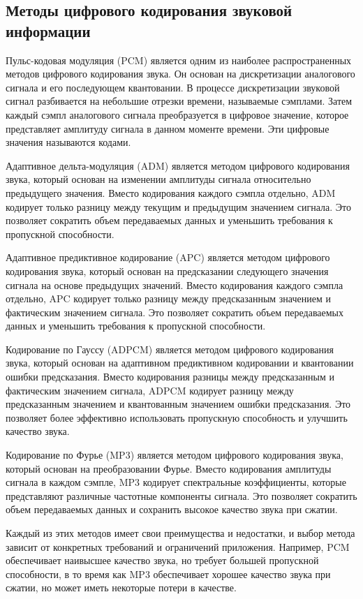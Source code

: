 \subsection{Методы цифрового кодирования звуковой информации}

Пульс-кодовая модуляция (PCM) является одним из наиболее распространенных методов цифрового кодирования звука. Он основан на дискретизации аналогового сигнала и его последующем квантовании. В процессе дискретизации звуковой сигнал разбивается на небольшие отрезки времени, называемые сэмплами. Затем каждый сэмпл аналогового сигнала преобразуется в цифровое значение, которое представляет амплитуду сигнала в данном моменте времени. Эти цифровые значения называются кодами.

Адаптивное дельта-модуляция (ADM) является методом цифрового кодирования звука, который основан на изменении амплитуды сигнала относительно предыдущего значения. Вместо кодирования каждого сэмпла отдельно, ADM кодирует только разницу между текущим и предыдущим значением сигнала. Это позволяет сократить объем передаваемых данных и уменьшить требования к пропускной способности.

Адаптивное предиктивное кодирование (APC) является методом цифрового кодирования звука, который основан на предсказании следующего значения сигнала на основе предыдущих значений. Вместо кодирования каждого сэмпла отдельно, APC кодирует только разницу между предсказанным значением и фактическим значением сигнала. Это позволяет сократить объем передаваемых данных и уменьшить требования к пропускной способности.

Кодирование по Гауссу (ADPCM) является методом цифрового кодирования звука, который основан на адаптивном предиктивном кодировании и квантовании ошибки предсказания. Вместо кодирования разницы между предсказанным и фактическим значением сигнала, ADPCM кодирует разницу между предсказанным значением и квантованным значением ошибки предсказания. Это позволяет более эффективно использовать пропускную способность и улучшить качество звука.

Кодирование по Фурье (MP3) является методом цифрового кодирования звука, который основан на преобразовании Фурье. Вместо кодирования амплитуды сигнала в каждом сэмпле, MP3 кодирует спектральные коэффициенты, которые представляют различные частотные компоненты сигнала. Это позволяет сократить объем передаваемых данных и сохранить высокое качество звука при сжатии.

Каждый из этих методов имеет свои преимущества и недостатки, и выбор метода зависит от конкретных требований и ограничений приложения. Например, PCM обеспечивает наивысшее качество звука, но требует большей пропускной способности, в то время как MP3 обеспечивает хорошее качество звука при сжатии, но может иметь некоторые потери в качестве.